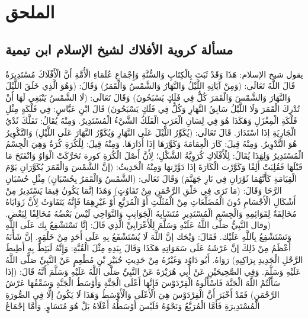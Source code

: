 \chapter{الملحق}
\label{sec:appendix}

\section{مسألة كروية الأفلاك لشيخ الإسلام ابن تيمية}
\label{sec:app_round_planets_teimia}

يقول شيخ الإسلام: هَذَا وَقَدْ ثَبَتَ بِالْكِتَابِ وَالسُّنَّةِ وَإِجْمَاعِ عُلَمَاءِ الْأُمَّةِ أَنَّ الْأَفْلَاكَ مُسْتَدِيرَةٌ قَالَ اللَّهُ تَعَالَى: (وَمِنْ آيَاتِهِ اللَّيْلُ وَالنَّهَارُ وَالشَّمْسُ وَالْقَمَرُ) وَقَالَ: (وَهُوَ الَّذِي خَلَقَ اللَّيْلَ وَالنَّهَارَ وَالشَّمْسَ وَالْقَمَرَ كُلٌّ فِي فَلَكٍ يَسْبَحُونَ) وَقَالَ تَعَالَى: (لَا الشَّمْسُ يَنْبَغِي لَهَا أَنْ تُدْرِكَ الْقَمَرَ وَلَا اللَّيْلُ سَابِقُ النَّهَارِ وَكُلٌّ فِي فَلَكٍ يَسْبَحُونَ) قَالَ ابْنِ عَبَّاسٍ: فِي فَلْكَةٍ مِثْلِ فَلْكَةِ الْمِغْزَلِ وَهَكَذَا هُوَ فِي لِسَانِ الْعَرَبِ الْفَلَكُ الشَّيْءُ الْمُسْتَدِيرُ. وَمِنْهُ يُقَالُ: تَفَلَّكَ ثَدْيُ الْجَارِيَةِ إذَا اسْتَدَارَ. قَالَ تَعَالَى: (يُكَوِّرُ اللَّيْلَ عَلَى النَّهَارِ وَيُكَوِّرُ النَّهَارَ عَلَى اللَّيْلِ) وَالتَّكْوِيرُ هُوَ التَّدْوِيرُ. وَمِنْهُ قِيلَ: كَارَ الْعِمَامَةَ وَكَوَّرَهَا إذَا أَدَارَهَا. وَمِنْهُ قِيلَ: لِلْكُرَةِ كُرَةٌ وَهِيَ الْجِسْمُ الْمُسْتَدِيرُ وَلِهَذَا يُقَالُ: لِلْأَفْلَاكِ كُرَوِيَّةُ الشَّكْلِ؛ لِأَنَّ أَصْلَ الْكُرَةِ كورة تَحَرَّكَتْ الْوَاوُ وَانْفَتَحَ مَا قَبْلَهَا فَقُلِبَتْ أَلِفًا وَكَوَّرْت الْكَارَةَ إذَا دَوَّرْتهَا وَمِنْهُ الْحَدِيثُ: (إنَّ الشَّمْسَ وَالْقَمَرَ يُكَوَّرَانِ يَوْمَ الْقِيَامَةِ كَأَنَّهُمَا ثَوْرَانِ فِي نَارِ جَهَنَّمَ) وَقَالَ تَعَالَى: (الشَّمْسُ وَالْقَمَرُ بِحُسْبَانٍ) مِثْلِ حُسْبَانِ الرَّحَا وَقَالَ: (مَا تَرَى فِي خَلْقِ الرَّحْمَنِ مِنْ تَفَاوُتٍ) وَهَذَا إنَّمَا يَكُونُ فِيمَا يَسْتَدِيرُ مِنْ أَشْكَالِ الْأَجْسَامِ دُونَ الْمُضَلَّعَاتِ مِنْ الْمُثَلَّثِ أَوْ الْمُرَبَّعِ أَوْ غَيْرِهِمَا فَإِنَّهُ يَتَفَاوَتُ لِأَنَّ زَوَايَاهُ مُخَالِفَةٌ لِقَوَائِمِهِ وَالْجِسْمِ الْمُسْتَدِيرِ مُتَشَابِهُ الْجَوَانِبِ وَالنَّوَاحِي لَيْسَ بَعْضُهُ مُخَالِفًا لِبَعْضِ. (وقال النَّبِيُّ صَلَّى اللَّهُ عَلَيْهِ وَسَلَّمَ لِلْأَعْرَابِيِّ الَّذِي قَالَ: إنَّا نَسْتَشْفِعُ بِك عَلَى اللَّهِ وَنَسْتَشْفِعُ بِاَللَّهِ عَلَيْك. فَقَالَ: وَيْحَك إنَّ اللَّهَ لَا يُسْتَشْفَعُ بِهِ عَلَى أَحَدٍ مِنْ خَلْقِهِ. إنَّ شَأْنَهُ أَعْظَمُ مِنْ ذَلِكَ إنَّ عَرْشَهُ عَلَى سَمَوَاتِهِ هَكَذَا وَقَالَ بِيَدِهِ مِثْلَ الْقُبَّةِ: وَإِنَّهُ لَيَئِطُّ بِهِ أَطِيطَ الرَّحْلِ الْجَدِيدِ بِرَاكِبِهِ) رَوَاهُ. أَبُو دَاوُد وَغَيْرُهُ مِنْ حَدِيثِ جُبَيْرِ بْنِ مُطْعِمٍ عَنْ النَّبِيِّ صَلَّى اللَّهُ عَلَيْهِ وَسَلَّمَ. وَفِي الصَّحِيحَيْنِ عَنْ أَبِي هُرَيْرَةَ عَنْ النَّبِيِّ صَلَّى اللَّهُ عَلَيْهِ وَسَلَّمَ أَنَّهُ قَالَ: (إذَا سَأَلْتُمْ اللَّهَ الْجَنَّةَ فَاسْأَلُوهُ الْفِرْدَوْسَ فَإِنَّهَا أَعْلَى الْجَنَّةِ وَأَوْسَطُ الْجَنَّةِ وَسَقْفُهَا عَرْشُ الرَّحْمَنِ) فَقَدْ أَخْبَرَ أَنَّ الْفِرْدَوْسَ هِيَ الْأَعْلَى وَالْأَوْسَطُ وَهَذَا لَا يَكُونُ إلَّا فِي الصُّورَةِ الْمُسْتَدِيرَةِ فَأَمَّا الْمُرَبَّعُ وَنَحْوُهُ فَلَيْسَ أَوْسَطُهُ أَعْلَاهُ بَلْ هُوَ مُتَسَاوٍ. وَأَمَّا إجْمَاعُ 